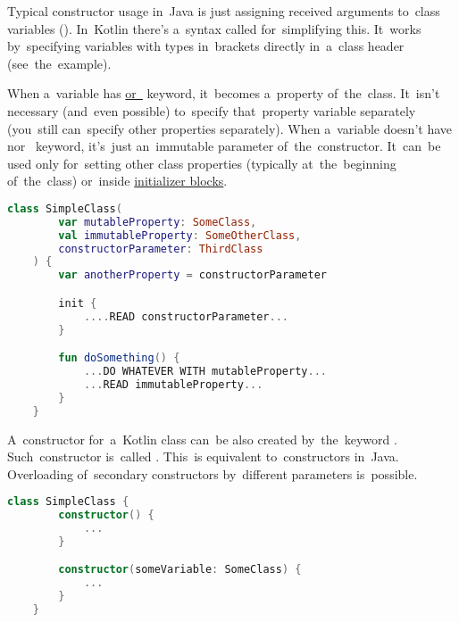 \label{kotlinconstructor}
\label{kotlinprimaryconstructor}
Typical constructor usage in~Java is just assigning received arguments to~class variables ().
In~Kotlin there's a~syntax called  for~simplifying this.
It~works by~specifying variables with types in~brackets directly in~a~class header (see~the~example).

When a~variable has \hyperref[kotlinvalvar]{ \mbox{or }} keyword, it~becomes \mbox{a property} of~the~class.
It~isn't necessary (and~even possible) to~specify that~property variable separately (you~still can~specify other properties separately).
When a~variable doesn't have  \mbox{nor } keyword, it's~just an~immutable parameter of~the~constructor.
It~can~be used only for~setting other class properties (typically at~the~beginning of~the~class) or~inside \hyperref[kotlininitblock]{initializer blocks}.

\begin{lstlisting}[language=Kotlin]
    class SimpleClass(
        var mutableProperty: SomeClass,
        val immutableProperty: SomeOtherClass,
        constructorParameter: ThirdClass
    ) {
        var anotherProperty = constructorParameter

        init {
            ....READ constructorParameter...
        }

        fun doSomething() {
            ...DO WHATEVER WITH mutableProperty...
            ...READ immutableProperty...
        }
    }
\end{lstlisting}
\newpage

\label{kotlinsecondaryconstructor}
A~constructor for~a~Kotlin class can~be also created by~the~keyword .
Such~constructor is~called .
This~is equivalent to~constructors in~Java.
Overloading of~secondary constructors by~different parameters is~possible.

\begin{lstlisting}[language=Kotlin]
    class SimpleClass {
        constructor() {
            ...
        }

        constructor(someVariable: SomeClass) {
            ...
        }
    }
\end{lstlisting}

